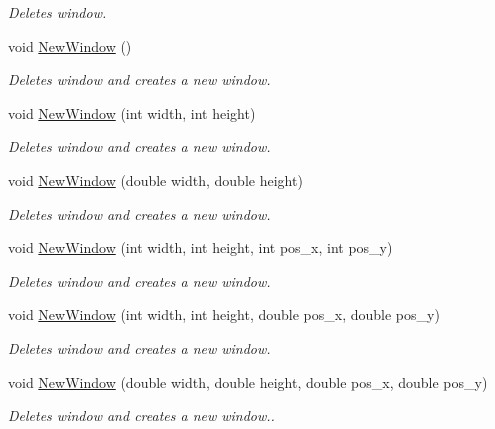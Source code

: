 \begin{DoxyCompactItemize}
\begin{DoxyCompactList}\small\item\em Deletes window. \end{DoxyCompactList}\item 
void \hyperlink{classostendo_1_1Window_a34de0bce2e7291c403dc0118309095fe}{New\+Window} ()
\begin{DoxyCompactList}\small\item\em Deletes window and creates a new window. \end{DoxyCompactList}\item 
void \hyperlink{classostendo_1_1Window_a61cbdf968a481f95b6b806ca9332e6c4}{New\+Window} (int width, int height)
\begin{DoxyCompactList}\small\item\em Deletes window and creates a new window. \end{DoxyCompactList}\item 
void \hyperlink{classostendo_1_1Window_a5d79595ea48972fc2e1752890d5e815b}{New\+Window} (double width, double height)
\begin{DoxyCompactList}\small\item\em Deletes window and creates a new window. \end{DoxyCompactList}\item 
void \hyperlink{classostendo_1_1Window_a90b76ea8f13d3eca15a08baf0e971804}{New\+Window} (int width, int height, int pos\+\_\+x, int pos\+\_\+y)
\begin{DoxyCompactList}\small\item\em Deletes window and creates a new window. \end{DoxyCompactList}\item 
void \hyperlink{classostendo_1_1Window_abffbcc2ef23f156ca9b6a4e04372e57b}{New\+Window} (int width, int height, double pos\+\_\+x, double pos\+\_\+y)
\begin{DoxyCompactList}\small\item\em Deletes window and creates a new window. \end{DoxyCompactList}\item 
void \hyperlink{classostendo_1_1Window_a3cc8c66d73a4bf082332a38d1b6850bb}{New\+Window} (double width, double height, double pos\+\_\+x, double pos\+\_\+y)
\begin{DoxyCompactList}\small\item\em Deletes window and creates a new window.. \end{DoxyCompactList}\item 

\end{DoxyCompactItemize}
